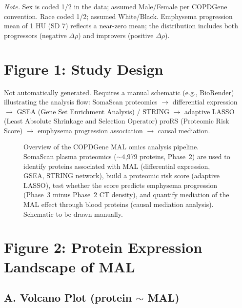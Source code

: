 \documentclass[11pt, letterpaper]{article}
\begin{document}
\noindent\textit{Note.} Sex is coded 1/2 in the data; assumed Male/Female
per COPDGene convention. Race coded 1/2; assumed White/Black. Emphysema
progression mean of 1 HU (SD 7) reflects a near-zero mean; the
distribution includes both progressors (negative $\Delta\rho$) and
improvers (positive $\Delta\rho$).

\section*{Figure 1: Study Design}

\noindent Not automatically generated. Requires a manual schematic
(e.g., BioRender) illustrating the analysis flow:
SomaScan proteomics $\to$ differential expression $\to$ GSEA (Gene Set
Enrichment Analysis) / STRING $\to$ adaptive LASSO (Least Absolute
Shrinkage and Selection Operator) proRS (Proteomic Risk Score) $\to$
emphysema progression association $\to$ causal mediation.

\begin{figure}[H]
  \centering
  \caption{Overview of the COPDGene MAL omics analysis pipeline.
    SomaScan plasma proteomics ($\sim$4,979 proteins, Phase~2) are used
    to identify proteins associated with MAL (differential expression,
    GSEA, STRING network), build a proteomic risk score (adaptive LASSO),
    test whether the score predicts emphysema progression (Phase~3
    minus Phase~2 CT density), and quantify mediation of the MAL effect
    through blood proteins (causal mediation analysis). Schematic to be
    drawn manually.}
\end{figure}

\section*{Figure 2: Protein Expression Landscape of MAL}

\subsection*{A. Volcano Plot (protein $\sim$ MAL)}
\end{document}
